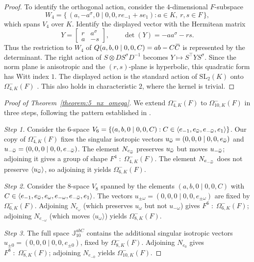 \documentclass{amsart}
\def\ovC{\mathord{\mbox{\hspace*{0pt}}\,\overline{\!C\!\!\;}\!\:}\mbox{\hspace*{0pt}}}
\def\ombb{\mathord{\mbox{\hspace*{0pt}}\;\!\overline{\!\!\:\omega\!\!\:}\;\!}\mbox{\hspace*{0pt}}}
\def\cn{\mathord{{\;\!{:}\;\!}}}
\newcommand{\SL}{\mathrm{SL}}
\newcommand{\J}{\mathbb{J}}
\newcommand{\s}{\sigma}
\newcommand{\T}{\top}
\theoremstyle{plain}
\numberwithin{theorem}{section}
\theoremstyle{definition}
\begin{document}
\begin{proof}
	To identify the orthogonal action, consider the $4$-dimensional $F$-subspace
	\begin{equation*}
		W_4=\{\,(a,-a^{\s},0\mid0,0,r e_{-1}+s e_1):
		       a\in K,\ r,s\in F\,\},
	\end{equation*}
	which spans $V_4$ over $K$. Identify the displayed vector with the
	Hermitean matrix
	\begin{equation*}
		Y=\begin{bmatrix}r&a^{\s}\\a&-s\end{bmatrix},
		\qquad \det(Y)=-aa^{\s}-rs.
	\end{equation*}
	Thus the restriction to $W_4$ of $Q(a,b,0\mid0,0,C)=ab-C\ovC$
	is represented by the determinant. The right action of
	$S\otimes DS^{\s}D^{-1}$ becomes $Y\mapsto S^{\T}YS^{\s}$.
	Since the norm plane is anisotropic and the $(r,s)$-plane is hyperbolic,
	this quadratic form has Witt index $1$. The displayed action is the
	standard action of $\SL_2(K)$ onto $\Omega_{4,K}^{-}(F)$
	\cite[Corollary~12.42]{Taylor}. This also holds in characteristic $2$,
	where the kernel is trivial.
\end{proof}

\begin{proof}[Proof of Theorem~\ref{theorem:5_nx_omega}]
We extend $\Omega_{4,K}^{-}(F)$ to $\Omega_{10,K}^{-}(F)$ in three steps, following the
pattern established in \cite{BSW1}.

\textit{Step 1.}
Consider the $6$-space $V_6 = \{(a,b,0\mid 0,0,C) : C \in \langle e_{-1}, e_{\ombb},
e_{-\ombb}, e_1\rangle\}$. Our copy of $\Omega_{4,K}^{-}(F)$ fixes the singular isotropic
vectors $u_{\ombb} = (0,0,0\mid 0,0,e_{\ombb})$ and $u_{-\ombb} = (0,0,0\mid 0,0,e_{-\ombb})$.
The element $N_{e_{\ombb}}$ preserves $u_{\ombb}$ but moves $u_{-\ombb}$; adjoining it
gives a group of shape $F^4 \cn \Omega_{4,K}^{-}(F)$. The element $N_{e_{-\ombb}}$ does
not preserve $\langle u_{\ombb}\rangle$, so adjoining it yields $\Omega_{6,K}^{-}(F)$.

\textit{Step 2.}
Consider the $8$-space $V_8$ spanned by the elements \mbox{$(a,b,0\mid 0,0,C)$} with
$C \in \langle e_{-1}, e_{\ombb}, e_{\omega}, e_{-\omega}, e_{-\ombb}, e_1\rangle$. The vectors
$u_{\pm\omega} = (0,0,0\mid 0,0,e_{\pm\omega})$ are fixed by $\Omega_{6,K}^{-}(F)$. 
Adjoining $N_{e_{\omega}}$ (which preserves $u_{\omega}$
but not $u_{-\omega}$) gives $F^6 \cn \Omega_{6,K}^{-}(F)$; adjoining $N_{e_{-\omega}}$
(which moves $\langle u_{\omega}\rangle$) yields $\Omega_{8,K}^{-}(F)$.

\textit{Step 3.}
The full space $\J_{10}^{abC}$ contains the additional singular isotropic vectors
$u_{\pm 0} = (0,0,0\mid 0,0,e_{\pm 0})$, fixed by
$\Omega_{8,K}^{-}(F)$. Adjoining $N_{e_0}$ gives $F^8 \cn \Omega_{8,K}^{-}(F)$;
adjoining $N_{e_{-0}}$ yields $\Omega_{10,K}^{-}(F)$.
\end{proof}
\end{document}
